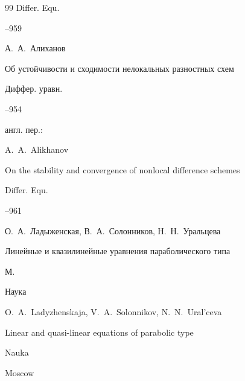 \begin{thebibliography}{99}
\jour  Differ. Equ. 




–959








\by А.~А.~Алиханов

\paper Об устойчивости и сходимости нелокальных разностных схем

\jour Диффер. уравн.




--954

\transl англ. пер.:~

\by A.~A.~Alikhanov 

\paper On the stability and convergence of nonlocal difference schemes

\jour Differ. Equ.




–961 










\by О.~А.~Ладыженская, В.~А.~Солонников, Н.~Н.~Уральцева

\book Линейные и квазилинейные уравнения параболического типа

\publaddr М.

\publ Наука



\misctransl

\by  O.~A.~Ladyzhenskaja,  V.~A.~Solonnikov,  N.~N.~Ural'ceva 

\book Linear and quasi-linear equations of parabolic type

\publ Nauka

\publaddr Moscow 





%

\end{thebibliography}





